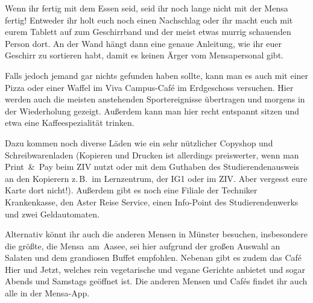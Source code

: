 \begin{multicols}{2}
Wenn ihr fertig mit dem Essen seid, seid ihr noch lange nicht mit der Mensa fertig!
Entweder ihr holt euch noch einen Nachschlag oder ihr macht euch mit eurem Tablett auf zum Geschirrband und der meist etwas murrig schauenden Person dort.
An der Wand hängt dann eine genaue Anleitung, wie ihr euer Geschirr zu sortieren habt, damit es keinen Ärger vom Mensapersonal gibt.


Falls jedoch jemand gar nichts gefunden haben sollte, kann man es auch mit einer Pizza oder einer Waffel im Viva Campus-Café im Erdgeschoss versuchen.
Hier werden auch die meisten anstehenden Sportereignisse übertragen und morgens in der Wiederholung gezeigt.
Außerdem kann man hier recht entspannt sitzen und etwa eine Kaffeespezialität trinken.

Dazu kommen noch diverse Läden wie ein sehr nützlicher Copyshop und Schreibwarenladen (Kopieren und Drucken ist allerdings preiswerter, wenn man Print~\&~Pay beim ZIV nutzt oder mit dem Guthaben des Studierendenausweis an den Kopierern z.\,B.\ im Lernzentrum, der IG1 oder im ZIV. Aber vergesst eure Karte dort nicht!). Außerdem gibt es noch eine Filiale der Techniker Krankenkasse, den Aster Reise Service, einen Info-Point des Studierendenwerks und zwei Geldautomaten.

Alternativ könnt ihr auch die anderen Mensen in Münster besuchen, insbesondere die größte, die Mensa~am~Aasee, sei hier aufgrund der großen Auswahl an Salaten und dem grandiosen Buffet empfohlen. Nebenan gibt es zudem das Café Hier und Jetzt, welches rein vegetarische und vegane Gerichte anbietet und sogar Abends und Samstags geöffnet ist. Die anderen Mensen und Cafés findet ihr auch alle in der Mensa-App.

\end{multicols}
